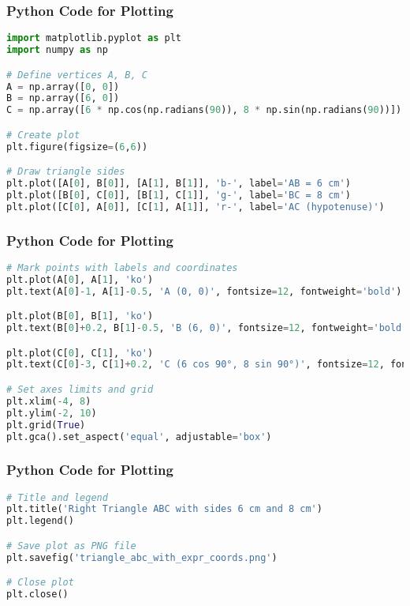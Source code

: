 \documentclass{beamer}
\numberwithin{equation}{section}
\begin{document}
\begin{frame}[fragile]
\frametitle{Python Code for Plotting}
\begin{lstlisting}[language=Python]
import matplotlib.pyplot as plt
import numpy as np

# Define vertices A, B, C
A = np.array([0, 0])
B = np.array([6, 0])
C = np.array([6 * np.cos(np.radians(90)), 8 * np.sin(np.radians(90))])  # (0, 8)

# Create plot
plt.figure(figsize=(6,6))

# Draw triangle sides
plt.plot([A[0], B[0]], [A[1], B[1]], 'b-', label='AB = 6 cm')
plt.plot([B[0], C[0]], [B[1], C[1]], 'g-', label='BC = 8 cm')
plt.plot([C[0], A[0]], [C[1], A[1]], 'r-', label='AC (hypotenuse)')
\end{lstlisting}

\end{frame}
\begin{frame}[fragile]
\frametitle{Python Code for Plotting}
\begin{lstlisting}[language=Python]
# Mark points with labels and coordinates
plt.plot(A[0], A[1], 'ko')
plt.text(A[0]-1, A[1]-0.5, 'A (0, 0)', fontsize=12, fontweight='bold')

plt.plot(B[0], B[1], 'ko')
plt.text(B[0]+0.2, B[1]-0.5, 'B (6, 0)', fontsize=12, fontweight='bold')

plt.plot(C[0], C[1], 'ko')
plt.text(C[0]-3, C[1]+0.2, 'C (6 cos 90°, 8 sin 90°)', fontsize=12, fontweight='bold')

# Set axes limits and grid
plt.xlim(-4, 8)
plt.ylim(-2, 10)
plt.grid(True)
plt.gca().set_aspect('equal', adjustable='box')
\end{lstlisting}

\end{frame}
\begin{frame}[fragile]
\frametitle{Python Code for Plotting}
\begin{lstlisting}[language=Python]
# Title and legend
plt.title('Right Triangle ABC with sides 6 cm and 8 cm')
plt.legend()

# Save plot as PNG file
plt.savefig('triangle_abc_with_expr_coords.png')

# Close plot
plt.close()
\end{lstlisting}

\end{frame}
\end{document}
